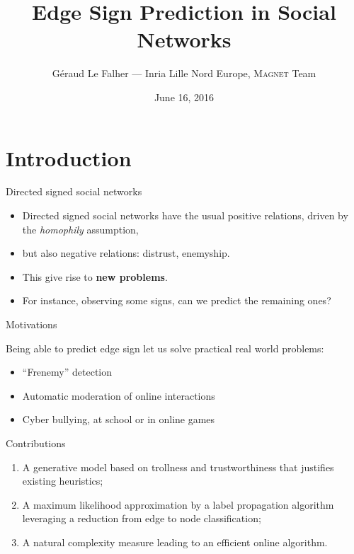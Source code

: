 \documentclass[svgnames,ignorenonframetext,final]{beamer}
\title{Edge Sign Prediction in Social Networks}
\author{Géraud Le Falher --- Inria Lille Nord Europe, \textsc{Magnet} Team}
\date{June 16, 2016}
\providecommand{\largelist}{%
  \setlength{\itemsep}{8pt}\setlength{\parskip}{3pt}}
\begin{document}
\frame{\titlepage}


\section[Problem and motivations]{Introduction}\label{introduction}

\begin{frame}{Directed signed social networks}

  \begin{itemize}
    \largelist
    \item
      Directed signed social networks have the usual positive relations,
      driven by the \emph{homophily} assumption,
    \item
      but also \alert{negative relations}: distrust, enemyship.
    \item
      This give rise to \textbf{new problems}.
    \item
      For instance, observing some signs, can we predict the remaining ones?
  \end{itemize}

\end{frame}

\begin{frame}{Motivations}

  Being able to predict edge sign let us solve practical real world problems:

  \begin{itemize}
    \largelist
  \item
    ``Frenemy'' detection~\autocite{frenemy12}
  \item
    Automatic moderation of online interactions
  \item
    Cyber bullying, at school or in online games~\autocite{CyberbullyingCHI15}
\end{itemize}

\end{frame}

\begin{frame}{Contributions}

  \begin{enumerate}
    \def\labelenumi{\arabic{enumi}.}
    \largelist
  \item
    A \alert{generative model} based on trollness and trustworthiness that
    justifies existing heuristics;
  \item
    A maximum likelihood approximation by a \alert{label propagation algorithm}
    leveraging a reduction from \alert{edge to node classification};
  \item
    A natural complexity measure leading to an efficient online algorithm.
\end{enumerate}

\end{frame}
\end{document}
